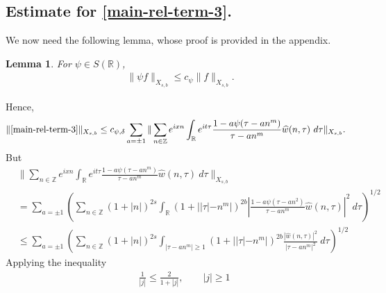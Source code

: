 \documentclass[12pt,reqno]{amsart}
\numberwithin{equation}{section}  %
\newcommand{\rr}{\mathbb{R}}
\newcommand{\zz}{\mathbb{Z}}
\newcommand{\wh}{\widehat}
\newtheorem{lemma}[theorem]{Lemma}
\begin{document}
\subsection{Estimate for \eqref{main-rel-term-3}.}
We now need the following lemma, whose proof is provided in the appendix.
%
%
%
%
%
%
%
%
\begin{lemma}
\label{lem:schwartz-mult}
	For $\psi \in S(\rr)$,
%
%
\begin{equation}
	\label{schwartz-mult}
	\begin{split}
    \|\psi f \|_{X_{s,b}} \le c_{\psi} \|f \|_{X_{s,b}}.
	\end{split}
\end{equation}
%
%
\end{lemma}
%
%
Hence,
%
%
\begin{equation}
  \label{yu}
	\begin{split}
		\|\eqref{main-rel-term-3}\|_{X_{s,b}} 
    & \le c_{\psi, \delta}
    \sum_{a = \pm 1} \| \sum_{n \in \zz} e^{ixn} \int_\rr 
		e^{it \tau} \frac{ 1 - a\psi (\tau - an^{m} ) 
		}{\tau - an^{m}} \wh{w}(n, \tau) \ 
		d \tau\|_{X_{s,b}}.
			\end{split}
\end{equation}
%
But
%
%
\begin{equation}
\label{main-int2-est-X-s-part}
\begin{split}
  & \| \sum_{n \in \zz} e^{ixn} \int_\rr 
		e^{it \tau} \frac{ 1 - a\psi (\tau - an^{m} ) 
		}{\tau - an^{m}} \wh{w}(n, \tau) \ 
		d \tau\|_{X_{s,b}}
		\\
    & = \sum_{a = \pm 1}\left( \sum_{n \in \zz} \left (1 + |n| \right )^{2s} \int_\rr
    (1 + |  |\tau| - n^{m}|)^{2b} \left | \frac{1 - a\psi(\tau - an^{2 
		})}{\tau - an^{m}} 
		\wh{w}(n, \tau) \right |^2 \ d 
		\tau \right)^{1/2}
		\\
    & \le \sum_{a = \pm 1}
    \left( \sum_{n \in \zz} \left (1 + |n| \right )^{2s} \int_{| \tau - an^{m }| \ge 1}
    (1 + | |\tau| - n^{m}|)^{2b} \frac{|\wh{w}(n, \tau)|^2 }{|\tau - an^{m }|^2} 
		\ d 
		\tau \right)^{1/2}
  \end{split}
\end{equation}
Applying the inequality
\begin{equation}
	\label{one-plus-ineq}
	\begin{split}
		& \frac{1}{|j|} \le \frac{2}{1 + |j| } , 
		\qquad |j| \ge 1
   	\end{split}
\end{equation}
\end{document}
